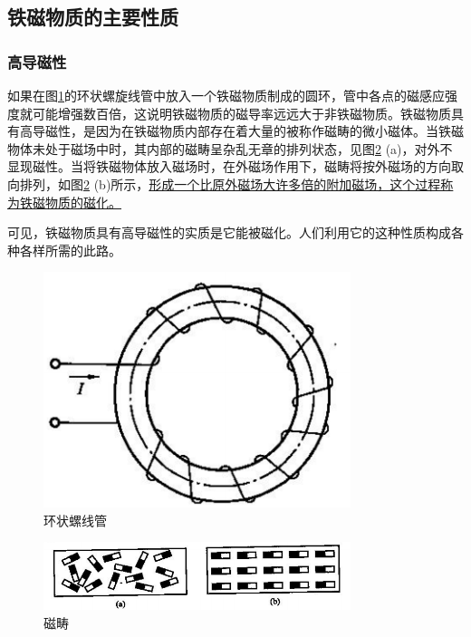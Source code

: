 \documentclass{book}
\begin{document}
\subsection{铁磁物质的主要性质}
\subsubsection{高导磁性}
如果在图\ref{fig_1.1}的环状螺旋线管中放入一个铁磁物质制成的圆环，管中各点的磁感应强度就可能增强数百倍，这说明铁磁物质的磁导率远远大于非铁磁物质。铁磁物质具有高导磁性，是因为在铁磁物质内部存在着大量的被称作磁畴的微小磁体。当铁磁物体未处于磁场中时，其内部的磁畴呈杂乱无章的排列状态，见图\ref{fig_1.2} (a)，对外不显现磁性。当将铁磁物体放入磁场时，在外磁场作用下，磁畴将按外磁场的方向取向排列，如图\ref{fig_1.2} (b)所示，\uline{形成一个比原外磁场大许多倍的附加磁场，这个过程称为铁磁物质的磁化。}

可见，铁磁物质具有高导磁性的实质是它能被磁化。人们利用它的这种性质构成各种各样所需的此路。

\begin{figure}[H]
	\centering
	\includegraphics[width=0.80\textwidth]{1-1.png}
	\caption{环状螺线管}
	\label{fig_1.1}
\end{figure}

\begin{figure}[H]
	\centering
	\includegraphics[width=0.80\textwidth]{1-2.png}
	\caption{磁畴}
	\label{fig_1.2}
\end{figure}
\end{document}
